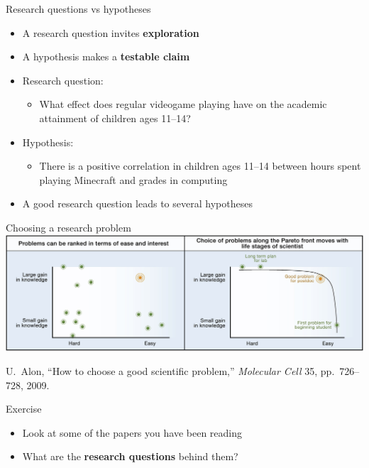 \begin{frame}{Research questions vs hypotheses}
	\begin{itemize}
		\pause\item A research question invites \textbf{exploration}
		\pause\item A hypothesis makes a \textbf{testable claim}
		\pause\item Research question:
			\begin{itemize}
				\item What effect does regular videogame playing have on the academic attainment of
					children ages 11--14?
			\end{itemize}
		\pause\item Hypothesis:
			\begin{itemize}
				\item There is a positive correlation in children ages 11--14
					between hours spent playing Minecraft and grades in computing
			\end{itemize}
		\pause\item A good research question leads to several hypotheses
	\end{itemize}
\end{frame}

\begin{frame}{Choosing a research problem}
	\includegraphics[width=\textwidth]{alon_fig1}
	
	{\tiny
	U.\ Alon, ``How to choose a good scientific problem,'' \textit{Molecular Cell} 35, pp.\ 726--728, 2009.
	}
\end{frame}

\begin{frame}{Exercise}
	\begin{itemize}
		\pause\item Look at some of the papers you have been reading
		\pause\item What are the \textbf{research questions} behind them?
	\end{itemize}
\end{frame}


